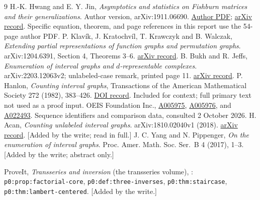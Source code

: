 \documentclass[11pt,letterpaper]{article}
\theoremstyle{definition}\newtheorem{definition}[theorem]{Definition}
\theoremstyle{remark}\newtheorem{remark}[theorem]{Remark}
\newcommand{\file}[1]{\nolinkurl{#1}}
\begin{document}
\begin{thebibliography}{9}
 H.-K. Hwang and E. Y. Jin,
\emph{Asymptotics and statistics on Fishburn matrices and their generalizations}.
Author version, arXiv:1911.06690.
\href{https://algo.stat.sinica.edu.tw/hk/files/2019/11/asymp-fishburn.pdf}{Author PDF};
\href{https://arxiv.org/abs/1911.06690}{arXiv record}.
Specific equation, theorem, and page references in this report use the 54-page author PDF.
 P. Klav\'ik, J. Kratochv\'il, T. Krawczyk and B. Walczak,
\emph{Extending partial representations of function graphs and permutation graphs}.
arXiv:1204.6391, Section 4, Theorems 3--6.
\href{https://arxiv.org/abs/1204.6391}{arXiv record}.
 B. Bukh and R. Jeffs,
\emph{Enumeration of interval graphs and $d$-representable complexes}.
arXiv:2203.12063v2; unlabeled-case remark, printed page 11.
\href{https://arxiv.org/abs/2203.12063}{arXiv record}.
 P. Hanlon,
\emph{Counting interval graphs}, Transactions of the American Mathematical Society
272 (1982), 383--426.
\href{https://doi.org/10.1090/S0002-9947-1982-0662044-8}{DOI record}.
Included for context; full primary text not used as a proof input.
 OEIS Foundation Inc.,
\href{https://oeis.org/A005975}{A005975},
\href{https://oeis.org/A005976}{A005976}, and
\href{https://oeis.org/A022493}{A022493}.
Sequence identifiers and comparison data, consulted 2 October 2026.
 H. Acan,
\emph{Counting unlabeled interval graphs}.
arXiv:1810.02040v1 (2018).
\href{https://arxiv.org/abs/1810.02040}{arXiv record}.
[Added by the write; read in full.]
 J. C. Yang and N. Pippenger,
\emph{On the enumeration of interval graphs}.
Proc. Amer. Math. Soc. Ser.~B 4 (2017), 1--3.
[Added by the write; abstract only.]
 \raggedright ProveIt, \emph{Transseries and inversion} (the transseries
volume), :
\file{p0:prop:factorial-core}, \file{p0:def:three-inverses},
\file{p0:thm:staircase}, \file{p0:thm:lambert-centered}.
[Added by the write.]
\end{thebibliography}
\end{document}
